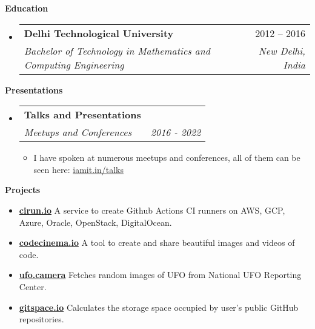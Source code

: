\documentclass[letterpaper,12pt]{article}[leftmargin=*]
\makeatletter
\def \entryspacing {-0pt}
\renewcommand{\section}[2]{\vspace{5pt}
  \colorbox{secondary}{\color{white}\raggedbottom\normalsize\textbf{{#1}{\hspace{7pt}#2}}}
}
\newcommand{\resumeEntryStart}{\begin{itemize}[leftmargin=2.5mm]}
\newcommand{\resumeEntryEnd}{\end{itemize}\vspace{\entryspacing}}
\newcommand{\resumeItemListStart}{\begin{itemize}[leftmargin=4.5mm]}
\newcommand{\resumeItemListEnd}{\end{itemize}}
\newcommand{\resumeItem}[1]{
  \item\small{
    {#1 \vspace{-2pt}}
  }
}
\newcommand{\resumeEntryTSDL}[4]{
  \vspace{-1pt}\item[]
    \begin{tabularx}{0.97\textwidth}{X@{\hspace{60pt}}r}
      \textbf{\color{primary}#1} & {\firabook\color{accent}\small#2} \\
      \textit{\color{accent}\small#3} & \textit{\color{accent}\small#4} \\
    \end{tabularx}\vspace{-6pt}
}
\newcommand{\resumeEntryTD}[2]{
  \vspace{-1pt}\item[]
    \begin{tabularx}{0.97\textwidth}{X@{\hspace{60pt}}r}
      \textbf{\color{primary}#1} & {\firabook\color{accent}\small#2} \\
    \end{tabularx}\vspace{-6pt}
}
\newcommand{\resumeEntryS}[2]{
  \item[]\small{
    \textbf{\color{primary}#1 }{ #2 \vspace{-6pt}}
  }
}
\makeatother
\begin{document}
\section{\faGraduationCap}{Education}

  \resumeEntryStart
    \resumeEntryTSDL
      {Delhi Technological University}{2012 -- 2016}
      {Bachelor of Technology in Mathematics and Computing Engineering}{New Delhi, India}
  \resumeEntryEnd

\section{\faBullhorn}{Presentations}
  \resumeEntryStart
    \resumeEntryTSDL
      {Talks and Presentations}{}
      {Meetups and Conferences}{2016 - 2022}
          \resumeItemListStart
    \resumeItem{I have spoken at numerous meetups and conferences, all of them can be seen here:  \href{https://iamit.in/talks}{iamit.in/talks}}
        \resumeItemListEnd
  \resumeEntryEnd
\section{\faFlask}{Projects}

 \resumeEntryStart
   \resumeEntryS{\href{https://cirun.io}{cirun.io}} {A service to create Github Actions CI runners on AWS, GCP, Azure, Oracle, OpenStack, DigitalOcean.}
  \resumeEntryS{\href{https://codecinema.io}{codecinema.io}}{A tool to create and share beautiful images and videos of code.}   
  \resumeEntryS{\href{https://ufo.camera}{ufo.camera}} {Fetches random images of UFO from National UFO Reporting Center.}
  \resumeEntryS{\href{https://gitspace.io}{gitspace.io}}{Calculates the storage space occupied by user's public GitHub repositories.}
 \resumeEntryEnd



\end{document}
